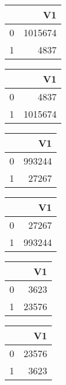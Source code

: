 \bigskip\bigskip
\centering
\begin{tabular}{rr}
  \hline
 & V1 \\ 
  \hline
0 & 1015674 \\ 
  1 & 4837 \\ 
   \hline
\end{tabular}

\bigskip\bigskip
\centering
\begin{tabular}{rr}
  \hline
 & V1 \\ 
  \hline
0 & 4837 \\ 
  1 & 1015674 \\ 
   \hline
\end{tabular}

\bigskip\bigskip
\centering
\begin{tabular}{rr}
  \hline
 & V1 \\ 
  \hline
0 & 993244 \\ 
  1 & 27267 \\ 
   \hline
\end{tabular}

\bigskip\bigskip
\centering
\begin{tabular}{rr}
  \hline
 & V1 \\ 
  \hline
0 & 27267 \\ 
  1 & 993244 \\ 
   \hline
\end{tabular}

\bigskip\bigskip
\centering
\begin{tabular}{rr}
  \hline
 & V1 \\ 
  \hline
0 & 3623 \\ 
  1 & 23576 \\ 
   \hline
\end{tabular}

\bigskip\bigskip
\centering
\begin{tabular}{rr}
  \hline
 & V1 \\ 
  \hline
0 & 23576 \\ 
  1 & 3623 \\ 
   \hline
\end{tabular}

